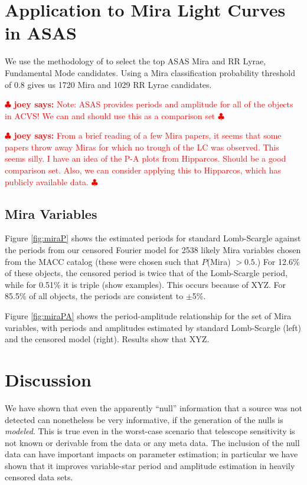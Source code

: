 \documentclass[12pt,preprint]{aastex}
\newcommand{\joey}[1] { \textcolor{red} {
\ensuremath{\clubsuit} {\bf joey says:}  {#1}
\ensuremath{\clubsuit} } }%
\begin{document}
\section{Application to Mira Light Curves in ASAS}
\label{sec:results}

We use the methodology of \cite{2011arXiv1106.2832R} to select the top ASAS Mira  and RR Lyrae, Fundamental Mode candidates.  Using a Mira classification probability threshold of 0.8 gives us 1720 Mira  and 1029 RR Lyrae candidates.

\joey{Note: ASAS provides periods and amplitude for all of the objects in ACVS!  We can and should use this as a comparison set}

\joey{From a brief reading of a few Mira papers, it seems that some papers throw away Miras for which no trough of the LC was observed.  This seems silly.  I have an idea of the P-A plots from Hipparcos.  Should be a good comparison set.  Also, we can consider applying this to Hipparcos, which has publicly available data.}


 \subsection{Mira Variables}

Figure \ref{fig:miraP} shows the estimated periods for standard Lomb-Scargle against the periods from our censored Fourier model for 2538 likely Mira variables chosen from the MACC catalog (these were chosen such that $P$(Mira) $>0.5$.)  For 12.6\% of these objects, the censored period is twice that of the Lomb-Scargle period, while for 0.51\% it is triple (show examples).  This occurs because of XYZ.  For 85.5\% of all objects, the periods are consistent to $\pm$5\%.



Figure \ref{fig:miraPA} shows the period-amplitude relationship for the set of Mira variables, with periods and amplitudes estimated by standard Lomb-Scargle (left) and the censored model (right).  Results show that XYZ.
 




\section{Discussion}
\label{sec:discussion}

We have shown that even the apparently ``null'' information that a
source was not detected can nonetheless be very informative, if the
generation of the nulls is \emph{modeled}.  This is true even in the
worst-case scenario that telescope sensitivity is not known or
derivable from the data or any meta data.  The inclusion of the null
data can have important impacts on parameter estimation; in particular
we have shown that it improves variable-star period and amplitude
estimation in heavily censored data sets.
\end{document}
